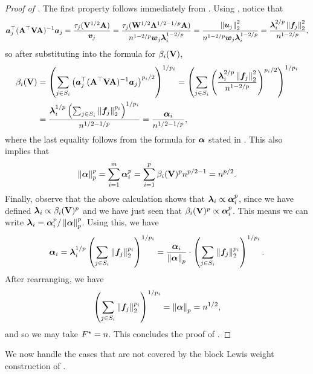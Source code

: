 \documentclass[11pt]{article}
\numberwithin{equation}{section}
\begin{document}
\begin{proof}[Proof of ]
The first property follows immediately from . Using , notice that
\begin{align*}
    \bm{a}_j^{\top}(\mathbf{A}^{\top}\mathbf{V}\mathbf{A})^{-1}\bm{a}_j = \frac{\tau_j(\mathbf{V}^{1/2}\mathbf{A})}{\bm{v}_j} = \frac{\tau_j(\mathbf{W}^{1/2}\mathbf{\Lambda}^{1/2-1/p}\mathbf{A})}{n^{1-2/p}\bm{w}_j\bm{\lambda}_i^{1-2/p}} = \frac{\left\lVert \bm{u}_j \right\rVert_2^2}{n^{1-2/p}\bm{w}_j\bm{\lambda}_i^{1-2/p}} = \frac{\bm{\lambda}_i^{2/p}\left\lVert \bm{f}_j \right\rVert_2^2}{n^{1-2/p}},
\end{align*}
so after substituting into the formula for $\beta_i(\mathbf{V})$,
\begin{align*}
    \beta_i(\mathbf{V}) &= \left(\sum_{j \in S_i} \left(\bm{a}_j^{\top}(\mathbf{A}^{\top}\mathbf{V}\mathbf{A})^{-1}\bm{a}_j\right)^{p_i/2}\right)^{1/p_i} = \left(\sum_{j \in S_i} \left(\frac{\bm{\lambda}_i^{2/p}\left\lVert \bm{f}_j \right\rVert_2^2}{n^{1-2/p}}\right)^{p_i/2}\right)^{1/p_i} \\
    &= \frac{\bm{\lambda}_i^{1/p}\left(\sum_{j \in S_i} \left\lVert \bm{f}_j \right\rVert_2^{p_i}\right)^{1/p_i}}{n^{1/2-1/p}} = \frac{\bm{\alpha}_i}{n^{1/2-1/p}},
\end{align*}
where the last equality follows from the formula for $\bm{\alpha}$ stated in . This also implies that
\begin{align*}
    \left\lVert \bm{\alpha} \right\rVert_p^p = \sum_{i=1}^m \bm{\alpha}_i^p = \sum_{i=1}^p \beta_i(\mathbf{V})^pn^{p/2-1} = n^{p/2}.
\end{align*}
Finally, observe that the above calculation shows that $\bm{\lambda}_i \propto \bm{\alpha}_i^p$, since we have defined $\bm{\lambda}_i \propto \beta_i(\mathbf{V})^p$ and we have just seen that $\beta_i(\mathbf{V})^p \propto \bm{\alpha}_i^p$. This means we can write $\bm{\lambda}_i = \bm{\alpha}_i^p/\left\lVert \bm{\alpha} \right\rVert_p^p$. Using this, we have
\begin{align*}
    \bm{\alpha}_i = \bm{\lambda}_i^{1/p}\left(\sum_{j \in S_i} \left\lVert \bm{f}_j \right\rVert_2^{p_i}\right)^{1/p_i} = \frac{\bm{\alpha}_i}{\left\lVert \bm{\alpha} \right\rVert_p} \cdot \left(\sum_{j \in S_i} \left\lVert \bm{f}_j \right\rVert_2^{p_i}\right)^{1/p_i}.
\end{align*}
After rearranging, we have
\begin{align*}
    \left(\sum_{j \in S_i} \left\lVert \bm{f}_j \right\rVert_2^{p_i}\right)^{1/p_i} = \left\lVert \bm{\alpha} \right\rVert_p = n^{1/2},
\end{align*}
and so we may take $F^{\star} = n$. This concludes the proof of .
\end{proof}

We now handle the cases that are not covered by the block Lewis weight construction of \citet{jlls23}.
\end{document}
